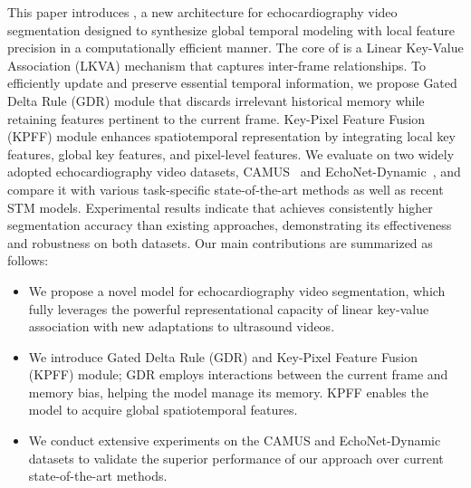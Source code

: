 This paper introduces \textbf{\mymodel}, a new architecture for echocardiography video segmentation designed to synthesize global temporal modeling with local feature precision in a computationally efficient manner. The core of \mymodel is a Linear Key-Value Association (LKVA) mechanism that captures inter-frame relationships. 
To efficiently update and preserve essential temporal information, we propose Gated Delta Rule (GDR) module that discards irrelevant historical memory while retaining features pertinent to the current frame. 
Key-Pixel Feature Fusion (KPFF) module enhances spatiotemporal representation by integrating local key features, global key features, and pixel-level features.
We evaluate \mymodel on two widely adopted echocardiography video datasets, CAMUS~\cite{leclerc2019deep} and EchoNet-Dynamic~\cite{ouyang2019echonet}, and compare it with various task-specific state-of-the-art methods as well as recent STM models. Experimental results indicate that \mymodel achieves consistently higher segmentation accuracy than existing approaches, demonstrating its effectiveness and robustness on both datasets.
Our main contributions are summarized as follows:
\begin{itemize}
  \item We propose a novel model \mymodel for echocardiography video segmentation, which fully leverages the powerful representational capacity of linear key-value association with new adaptations to ultrasound videos.
  \item We introduce Gated Delta Rule (GDR) and Key-Pixel Feature Fusion (KPFF) module; GDR employs interactions between the current frame and memory bias, helping the model manage its memory. KPFF enables the model to acquire global spatiotemporal features. 
  \item We conduct extensive experiments on the CAMUS and EchoNet-Dynamic datasets to validate the superior performance of our approach over current state-of-the-art methods.
\end{itemize}